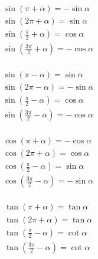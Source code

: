 \documentclass[a4paper, fleqn, fontset = mac]{ctexart}
\begin{document}
	\noindent
	\begin{minipage}{0.2\textwidth}
	\small
	\begin{align*}
		& \sin\left( \pi + \alpha \right) = -\sin\alpha \\
		& \sin\left( 2\pi + \alpha \right) = \sin\alpha \\
		& \sin\left( \frac\pi2 + \alpha \right) = \cos\alpha \\
		& \sin\left( \frac{3\pi}2 + \alpha \right) = -\cos\alpha \\
	\end{align*}
	\end{minipage}
	\begin{minipage}{0.2\textwidth}
	\small
	\begin{align*}
		& \sin\left( \pi - \alpha \right) = \sin\alpha \\
		& \sin\left( 2\pi - \alpha \right) = -\sin\alpha \\
		& \sin\left( \frac\pi2 - \alpha \right) = \cos\alpha \\
		& \sin\left( \frac{3\pi}2 - \alpha \right) = -\cos\alpha \\
		\end{align*}
	\end{minipage}
	\begin{minipage}{0.2\textwidth}
	\small
	\begin{align*}
		& \cos\left( \pi + \alpha \right) = -\cos\alpha \\
		& \cos\left( 2\pi + \alpha \right) = \cos\alpha \\
		& \cos\left( \frac\pi2 - \alpha \right) = \sin\alpha \\
		& \cos\left( \frac{3\pi}2 - \alpha \right) = -\sin\alpha \\
	\end{align*}
	\end{minipage}
	\begin{minipage}{0.2\textwidth}
	\small
	\begin{align*}
		& \tan\left( \pi + \alpha \right) = \tan\alpha \\
		& \tan\left( 2\pi + \alpha \right) = \tan\alpha \\
		& \tan\left( \frac\pi2 - \alpha \right) = \cot\alpha \\
		& \tan\left( \frac{3\pi}2 - \alpha \right) = \cot\alpha \\
	\end{align*}
	\end{minipage}
\end{document}
